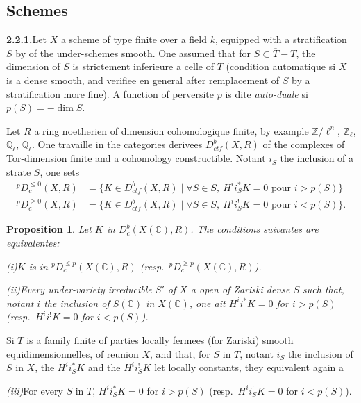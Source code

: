 \documentclass[12pt,a4paper]{article}
\theoremstyle{plain}
\newtheorem{proposition}[theorem]{Proposition}
\theoremstyle{definition}
\begin{document}
\subsection{Schemes}

\noindent\textbf{2.2.1.}\quad Let $X$ a scheme of type finite over a field $k$, equipped with a stratification $S$ by of the under-schemes smooth. One assumed that for $S \subset \overline{T} - T$, the dimension of $S$ is strictement inferieure a celle of $T$ (condition automatique si $X$ is a dense smooth, and verifiee en general after remplacement of $S$ by a stratification more fine). A function of perversite $p$ is dite \emph{auto-duale} si $p(S) = -\dim S$.

Let $R$ a ring noetherien of dimension cohomologique finite, by example $\mathbb{Z}/\ell^n$, $\mathbb{Z}_\ell$, $\mathbb{Q}_\ell$, $\overline{\mathbb{Q}}_\ell$. One travaille in the categories derivees $D_{ctf}^b(X, R)$ of the complexes of Tor-dimension finite and a cohomology constructible. Notant $i_S$ the inclusion of a strate $S$, one sets
\begin{align*}
{}^p D_c^{\leqslant 0}(X, R) &= \{K \in D_{ctf}^b(X, R) \mid \forall S \in S,\ H^i i_S^* K = 0 \text{ pour } i > p(S)\}\\
{}^p D_c^{\geqslant 0}(X, R) &= \{K \in D_{ctf}^b(X, R) \mid \forall S \in S,\ H^i i_S^! K = 0 \text{ pour } i < p(S)\}.
\end{align*}

\begin{proposition}\label{prop:2.2.2}
Let $K$ in $D_c^b(X(\mathbb{C}), R)$. The conditions suivantes are equivalentes:

\emph{(i)}\quad $K$ is in ${}^p D_c^{\leqslant p}(X(\mathbb{C}), R)$ (resp.\ ${}^p D_c^{\geqslant p}(X(\mathbb{C}), R)$).

\emph{(ii)}\quad Every under-variety irreducible $S'$ of $X$ a open of Zariski dense $S$ such that, notant $i$ the inclusion of $S(\mathbb{C})$ in $X(\mathbb{C})$, one ait $H^i i^* K = 0$ for $i > p(S)$ (resp.\ $H^i i^! K = 0$ for $i < p(S)$).
\end{proposition}

Si $T$ is a family finite of parties locally fermees (for Zariski) smooth equidimensionnelles, of reunion $X$, and that, for $S$ in $T$, notant $i_S$ the inclusion of $S$ in $X$, the $H^i i_S^* K$ and the $H^i i_S^! K$ let locally constants, they equivalent again a

\emph{(iii)}\quad For every $S$ in $T$, $H^i i_S^* K = 0$ for $i > p(S)$ (resp.\ $H^i i_S^! K = 0$ for $i < p(S)$).
\end{document}
